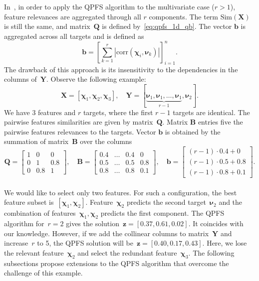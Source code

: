 \documentclass[12pt,twoside]{article}
\theoremstyle{definition}
\newcommand{\bz}{\mathbf{z}}
\newcommand{\bb}{\mathbf{b}}
\newcommand{\bY}{\mathbf{Y}}
\newcommand{\bX}{\mathbf{X}}
\newcommand{\bB}{\mathbf{B}}
\newcommand{\bQ}{\mathbf{Q}}
\newcommand{\bchi}{\boldsymbol{\chi}}
\newcommand{\bnu}{\boldsymbol{\nu}}
\begin{document}
In~\cite{motrenko2018multi}, in order to apply the QPFS algorithm to the multivariate case ($r > 1$), feature relevances are aggregated through all $r$ components. The term $\text{Sim}(\bX)$ is still the same, and matrix~$\bQ$ is defined by~\eqref{eq:qpfs_1d_qb}. The vector $\bb$ is aggregated across all targets and is defined as
\begin{equation*}
\bb = \left[\sum_{k=1}^r|\text{corr}(\bchi_i, \bnu_k)|\right]_{i=1}^n.
\end{equation*}
The drawback of this approach is its insensitivity to the dependencies in the columns of~$\bY$. Observe the following example:
\begin{equation*}
\bX = [\bchi_1, \bchi_2, \bchi_3], \quad \bY = [\underbrace{\bnu_1, \bnu_1, \dots, \bnu_1}_{r-1}, \bnu_2].
\end{equation*}
We have 3 features and $r$ targets, where the first $r-1$ targets are identical.
The pairwise features similarities are given by matrix~$\bQ$.
Matrix $\bB$ entries five the pairwise features relevances to the targets.
Vector $\bb$ is obtained by the summation of matrix~$\bB$ over the columns
\begin{equation}
\bQ = \begin{bmatrix} 1 & 0 & 0\\ 0 & 1 & 0.8 \\ 0 & 0.8 & 1 \end{bmatrix}, \quad
\bB = \begin{bmatrix} 0.4 & \dots & 0.4 & 0 \\ 0.5 & \dots & 0.5 & 0.8 \\ 0.8 & \dots & 0.8 & 0.1 \end{bmatrix}, \quad
\bb = \begin{bmatrix} (r-1) \cdot 0.4 + 0 \\ (r-1) \cdot 0.5 + 0.8 \\ (r-1) \cdot 0.8 + 0.1 \end{bmatrix}.
\label{eq:qpfs_example}
\end{equation}
\vspace{0.5cm} \\
We would like to select only two features.
For such a configuration, the best feature subset is~$[\bchi_1, \bchi_2]$.
Feature~$\bchi_2$ predicts the second target~$\bnu_2$ and the combination of features~$\bchi_1, \bchi_2$ predicts the first component.
The QPFS algorithm for~$r=2$ gives the solution~$\bz = [0.37,	0.61,	0.02]$. It coincides with our knowledge.
However, if we add the collinear columns to matrix~$\bY$ and increase~$r$ to 5, the QPFS solution will be~$\bz = [0.40,	0.17, 0.43]$.
Here, we lose the relevant feature~$\bchi_2$ and select the redundant feature~$\bchi_3$.
The following subsections propose extensions to the QPFS algorithm that overcome the challenge of this example.
\end{document}
